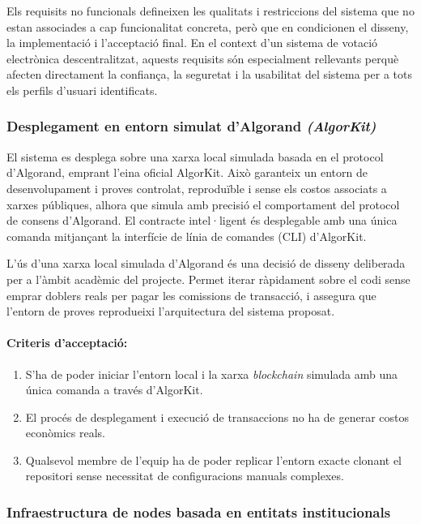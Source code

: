 Els requisits no funcionals defineixen les qualitats i restriccions del sistema que no estan associades a cap funcionalitat concreta, però que en condicionen el disseny, la implementació i l'acceptació final.
En el context d'un sistema de votació electrònica descentralitzat, aquests requisits són especialment rellevants perquè afecten directament la confiança, la seguretat i la usabilitat del sistema per a tots els perfils d'usuari identificats.

\subsubsection{Desplegament en entorn simulat d'Algorand \textit{(AlgorKit)}}

El sistema es desplega sobre una xarxa local simulada basada en el protocol d'Algorand, emprant l'eina oficial AlgorKit.
Això garanteix un entorn de desenvolupament i proves controlat, reproduïble i sense els costos associats a xarxes públiques, alhora que simula amb precisió el comportament del protocol de consens d'Algorand.
El contracte intel·ligent és desplegable amb una única comanda mitjançant la interfície de línia de comandes (CLI) d'AlgorKit.

L'ús d'una xarxa local simulada d'Algorand és una decisió de disseny deliberada per a l'àmbit acadèmic del projecte. 
Permet iterar ràpidament sobre el codi sense emprar doblers reals per pagar les comissions de transacció, i assegura que l'entorn de proves reprodueixi l'arquitectura del sistema proposat.

\paragraph{Criteris d'acceptació:}
\begin{enumerate}[label=\roman*.]
    \item S'ha de poder iniciar l'entorn local i la xarxa \textit{blockchain} simulada amb una única comanda a través d'AlgorKit.
    \item El procés de desplegament i execució de transaccions no ha de generar costos econòmics reals.
    \item Qualsevol membre de l'equip ha de poder replicar l'entorn exacte clonant el repositori sense necessitat de configuracions manuals complexes.
\end{enumerate}

\subsubsection{Infraestructura de nodes basada en entitats institucionals}

